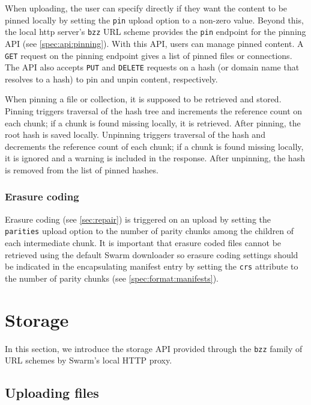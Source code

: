 When uploading, the user can specify directly if they want the content to be pinned locally by setting the \lstinline{pin} upload option to a non-zero value. Beyond this, the local http server's \lstinline{bzz} URL scheme provides the \lstinline{pin} endpoint for the pinning API (see \ref{spec:api:pinning}). With this API, users can manage pinned content. A \lstinline{GET} request on the pinning endpoint gives a list of pinned files or connections.  The API also accepts \lstinline{PUT} and \lstinline{DELETE} requests on a hash (or domain name that resolves to a hash) to pin and unpin content, respectively.  

When pinning a file or collection, it is supposed to be retrieved and stored. Pinning triggers traversal of the hash tree and increments the reference count on each chunk; if a chunk is found missing locally, it is retrieved. After pinning, the root hash is saved locally. Unpinning triggers traversal of the hash and decrements the reference count of each chunk; if a chunk is found missing locally, it is ignored and a warning is included in the response. After unpinning, the hash is removed from the list of pinned hashes. 



\subsubsection{Erasure coding}

Erasure coding (see \ref{sec:repair}) is triggered on an upload by setting the \lstinline{parities} upload option to the number of parity chunks among the children of each intermediate chunk. It is important that erasure coded files cannot be retrieved using the default Swarm downloader so erasure coding settings should be indicated in the encapsulating manifest entry by setting the \lstinline{crs} attribute to the number of parity chunks (see \ref{spec:format:manifests}). 

\section{Storage \statusgreen}\label{sec:storage-ux}

\green{}


In this section, we introduce the storage API provided through the \lstinline{bzz} family of URL schemes by Swarm's local HTTP proxy.

\subsection{Uploading files \statusgreen}\label{sec:file-api}

